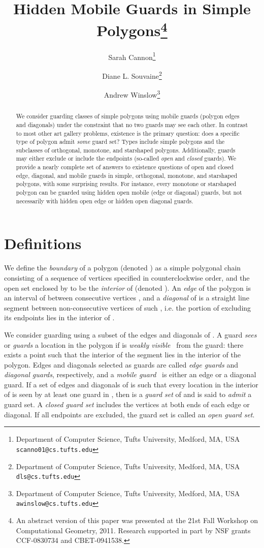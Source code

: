 \documentclass{cccg12}
\title{Hidden Mobile Guards in Simple Polygons\footnote{An abstract version of this paper was presented at the 21st Fall Workshop on Computational Geometry, 2011. Research supported in part by NSF grants CCF-0830734 and CBET-0941538.}}
\author{Sarah Cannon\thanks{Department of Computer Science,
	Tufts University, Medford, MA, USA {\tt scanno01@cs.tufts.edu}}
	\and
        Diane L. Souvaine\thanks{Department of Computer Science,
        Tufts University, Medford, MA, USA {\tt dls@cs.tufts.edu}}
	\and
        Andrew Winslow\thanks{Department of Computer Science,
        Tufts University, Medford, MA, USA {\tt awinslow@cs.tufts.edu}}}
\begin{document}
\thispagestyle{empty}
\maketitle

\begin{abstract}
We consider guarding classes of simple polygons using mobile guards (polygon edges and diagonals) under the constraint that no two guards may see each other.
In contrast to most other art gallery problems, existence is the primary question: does a specific type of polygon admit \emph{some} guard set?
Types include simple polygons and the subclasses of orthogonal, monotone, and starshaped polygons.
Additionally, guards may either exclude or include the endpoints (so-called \emph{open} and \emph{closed} guards).
We provide a nearly complete set of answers to existence questions of open and closed edge, diagonal, and mobile guards in simple, orthogonal, monotone, and starshaped polygons, with some surprising results. 
For instance, every monotone or starshaped polygon can be guarded using hidden open mobile (edge or diagonal) guards, but not necessarily with hidden open edge or hidden open diagonal guards. 
\end{abstract}

\section{Definitions}

We define the \emph{boundary} of a polygon  (denoted ) as a simple polygonal chain consisting of a sequence of vertices specified in counterclockwise order, and the open set enclosed by  to be the \emph{interior} of  (denoted ).
An \emph{edge}  of the polygon is an interval of  between consecutive vertices , and a \emph{diagonal}  of  is a straight line segment between non-consecutive vertices  of  such , i.e. the portion of  excluding its endpoints lies in the interior of .

We consider guarding  using a subset of the edges and diagonals of .
A guard  \emph{sees} or \emph{guards} a location  in the polygon if  is \emph{weakly visible}~\cite{Avis-1981} from the guard: there exists a point  such that the interior of the segment  lies in the interior of the polygon.
Edges and diagonals selected as guards are called \emph{edge guards} and \emph{diagonal guards}, respectively, and a \emph{mobile guard}~\cite{ORourke-1983} is either an edge or a diagonal guard.
If a set  of edges and diagonals of  is such that every location in the interior of  is seen by at least one guard in , then  is a \emph{guard set} of  and  is said to \emph{admit} a guard set.
A \emph{closed guard set} includes the vertices at both ends of each edge or diagonal.
If all endpoints are excluded, the guard set is called an \emph{open guard set}.
 
\end{document}

